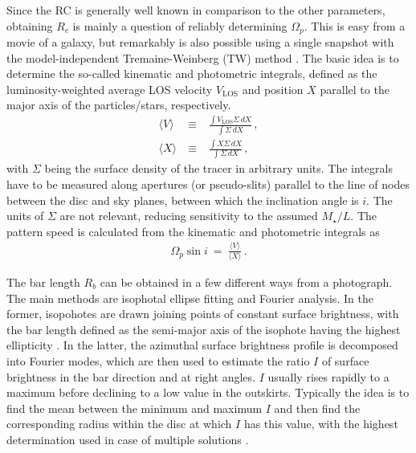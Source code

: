 \documentclass[fleqn,usenatbib,useAMS]{mnras} %
\begin{document}
Since the RC is generally well known in comparison to the other parameters, obtaining $R_c$ is mainly a question of reliably determining $\Omega_p$. This is easy from a movie of a galaxy, but remarkably is also possible using a single snapshot with the model-independent Tremaine-Weinberg (TW) method \citep{Tremaine_1984}. The basic idea is to determine the so-called kinematic and photometric integrals, defined as the luminosity-weighted average LOS velocity $V_{\text{LOS}}$ and position $X$ parallel to the major axis of the particles/stars, respectively.
\begin{eqnarray}
    \langle V \rangle ~&\equiv&~ \frac{\int V_{\text{LOS}} \Sigma \, dX}{\int \Sigma \, dX} \, , \\
    \langle X \rangle ~&\equiv&~ \frac{\int X \Sigma \, dX}{\int \Sigma \, dX} \, ,
\end{eqnarray}
with $\Sigma$ being the surface density of the tracer in arbitrary units. The integrals have to be measured along apertures (or pseudo-slits) parallel to the line of nodes between the disc and sky planes, between which the inclination angle is $i$. The units of $\Sigma$ are not relevant, reducing sensitivity to the assumed $M_{\star}/L$. The pattern speed is calculated from the kinematic and photometric integrals as
\begin{eqnarray}
	\Omega_p \sin i ~=~ \frac{\langle V \rangle}{\langle X \rangle} \, .
\end{eqnarray}

The bar length $R_b$ can be obtained in a few different ways from a photograph. The main methods are isophotal ellipse fitting and Fourier analysis. In the former, isopohotes are drawn joining points of constant surface brightness, with the bar length defined as the semi-major axis of the isophote having the highest ellipticity \citep{Aguerri_2009}. In the latter, the azimuthal surface brightness profile is decomposed into Fourier modes, which are then used to estimate the ratio $I$ of surface brightness in the bar direction and at right angles. $I$ usually rises rapidly to a maximum before declining to a low value in the outskirts. Typically the idea is to find the mean between the minimum and maximum $I$ and then find the corresponding radius within the disc at which $I$ has this value, with the highest determination used in case of multiple solutions \citep{Aguerri_2000}.
\end{document}
